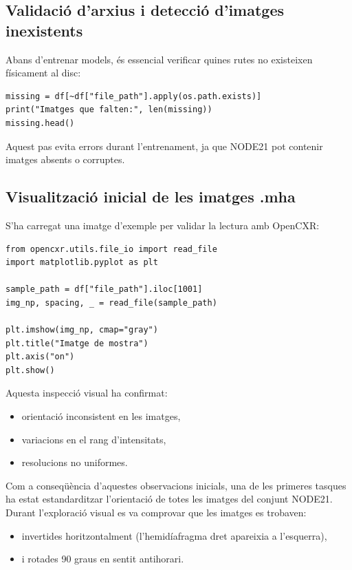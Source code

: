 \documentclass[12pt,a4paper]{article}
\begin{document}
\subsection{Validació d’arxius i detecció d’imatges inexistents}

Abans d'entrenar models, és essencial verificar quines rutes no existeixen físicament al disc:

\begin{lstlisting}[style=mypython]
missing = df[~df["file_path"].apply(os.path.exists)]
print("Imatges que falten:", len(missing))
missing.head()
\end{lstlisting}

Aquest pas evita errors durant l'entrenament, ja que NODE21 pot contenir imatges absents o corruptes.

\subsection{Visualització inicial de les imatges .mha}

S’ha carregat una imatge d’exemple per validar la lectura amb OpenCXR:

\begin{lstlisting}[style=mypython]
from opencxr.utils.file_io import read_file
import matplotlib.pyplot as plt

sample_path = df["file_path"].iloc[1001]
img_np, spacing, _ = read_file(sample_path)

plt.imshow(img_np, cmap="gray")
plt.title("Imatge de mostra")
plt.axis("on")
plt.show()
\end{lstlisting}

Aquesta inspecció visual ha confirmat:

\begin{itemize}
    \item orientació inconsistent en les imatges,
    \item variacions en el rang d'intensitats,
    \item resolucions no uniformes.
\end{itemize}

Com a conseqüència d’aquestes observacions inicials, una de les primeres tasques ha estat
estandarditzar l’orientació de totes les imatges del conjunt NODE21. Durant l’exploració
visual es va comprovar que les imatges es trobaven:

\begin{itemize}
    \item invertides horitzontalment (l’hemidíafragma dret apareixia a l’esquerra),
    \item i rotades 90 graus en sentit antihorari.
\end{itemize}
\end{document}

